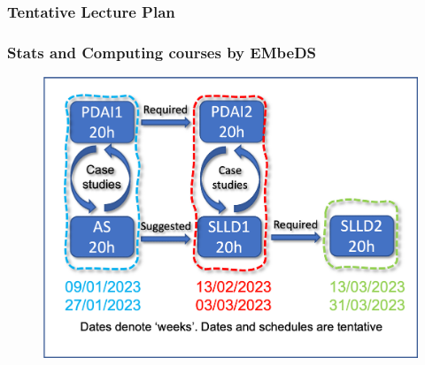 \documentclass{beamer}%
\begin{document}
\begin{frame}
  \frametitle{Tentative Lecture Plan}
  \centering
    
\end{frame}

\begin{frame}
	\frametitle{Stats and Computing courses by EMbeDS}
	\centering
\begin{figure}
	\includegraphics[width=0.95\linewidth]{../../tentativeSchedule.png}
\end{figure} 
\end{frame}



%  
\end{document}
